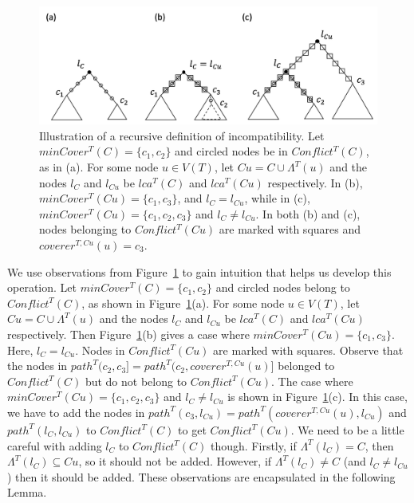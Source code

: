 \documentclass[final,1p,times]{elsarticle}
\newcommand{\leafset}{\Lambda}
\begin{document}
    \begin{figure}[ht]
        \includegraphics[scale=0.6]{incompatibilityrecursive}
        \centering
        \caption[Recursively defining incompatibility]{Illustration of a recursive definition of incompatibility. Let $minCover^{T}(C) = \{c_1, c_2\}$ and circled nodes be in $Conflict^{T}(C)$, as in (a). For some node $u \in V(T)$, let $Cu = C \cup \leafset^{T}(u)$ and the nodes $l_C$ and $l_{Cu}$ be $lca^{T}(C)$ and $lca^{T}(Cu)$ respectively. In (b), $minCover^{T}(Cu) = \{c_1, c_3\}$, and $l_C = l_{Cu}$, while in (c), $minCover^{T}(Cu) = \{c_1, c_2, c_3\}$ and $l_C \neq l_{Cu}$. In both (b) and (c), nodes belonging to $Conflict^{T}(Cu)$ are marked with squares and $coverer^{T, Cu}(u) = c_3$.}
        \label{fig:incompatibilityrecursive}
    \end{figure}

    We use observations from Figure~\ref{fig:incompatibilityrecursive} to gain intuition that helps us develop this operation. Let $minCover^{T}(C) = \{c_1, c_2\}$ and circled nodes belong to $Conflict^{T}(C)$, as shown in Figure~\ref{fig:incompatibilityrecursive}(a). For some node $u \in V(T)$, let $Cu = C \cup \leafset^{T}(u)$ and the nodes $l_C$ and $l_{Cu}$ be $lca^{T}(C)$ and $lca^{T}(Cu)$ respectively. Then Figure~\ref{fig:incompatibilityrecursive}(b) gives a case where $minCover^{T}(Cu) = \{c_1, c_3\}$. Here, $l_C = l_{Cu}$. Nodes in $Conflict^{T}(Cu)$ are marked with squares. Observe that the nodes in $path^{T}(c_2, c_3] = path^{T}(c_2, coverer^{T, Cu}(u)]$ belonged to $Conflict^{T}(C)$ but do not belong to $Conflict^{T}(Cu)$. The case where $minCover^{T}(Cu) = \{c_1, c_2, c_3\}$ and $l_C \neq l_{Cu}$ is shown in Figure~\ref{fig:incompatibilityrecursive}(c). In this case, we have to add the nodes in $path^{T}(c_3, l_{Cu}) = path^{T}(coverer^{T, Cu}(u), l_{Cu})$ and $path^{T}(l_C, l_{Cu})$ to $Conflict^{T}(C)$ to get $Conflict^{T}(Cu)$. We need to be a little careful with adding $l_C$ to $Conflict^{T}(C)$ though. Firstly, if $\leafset^{T}(l_C) = C$, then $\leafset^{T}(l_C) \subseteq Cu$, so it should not be added. However, if $\leafset^{T}(l_C) \neq C$ (and $l_C \neq l_{Cu}$) then it should be added. These observations are encapsulated in the following Lemma.
    \newline
\end{document}
